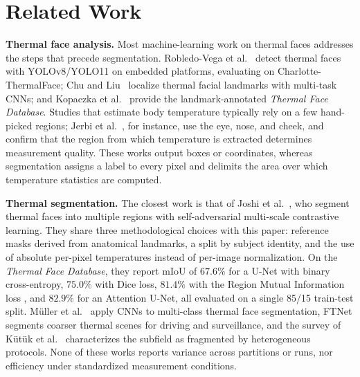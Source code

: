 \section{Related Work} \label{sec:trab_relac}

\textbf{Thermal face analysis.}
Most machine-learning work on thermal faces addresses the steps that precede segmentation.
Robledo-Vega et al.~\cite{Vega2025} detect thermal faces with YOLOv8/YOLO11 on embedded platforms, evaluating on Charlotte-ThermalFace; Chu and Liu~\cite{Chu2019} localize thermal facial landmarks with multi-task CNNs; and Kopaczka et al.~\cite{Kopaczka2018} provide the landmark-annotated \textit{Thermal Face Database}.
Studies that estimate body temperature typically rely on a few hand-picked regions; Jerbi et al.~\cite{Jerbi2024}, for instance, use the eye, nose, and cheek, and confirm that the region from which temperature is extracted determines measurement quality.
These works output boxes or coordinates, whereas segmentation assigns a label to every pixel and delimits the area over which temperature statistics are computed.

\textbf{Thermal segmentation.}
The closest work is that of Joshi et al.~\cite{Joshi2022}, who segment thermal faces into multiple regions with self-adversarial multi-scale contrastive learning.
They share three methodological choices with this paper: reference masks derived from anatomical landmarks, a split by subject identity, and the use of absolute per-pixel temperatures instead of per-image normalization.
On the \textit{Thermal Face Database}, they report mIoU of $67.6\%$ for a U-Net with binary cross-entropy, $75.0\%$ with Dice loss, $81.4\%$ with the Region Mutual Information loss \cite{Zhao2019}, and $82.9\%$ for an Attention U-Net, all evaluated on a single 85/15 train-test split.
M\"uller et al.~\cite{Muller2021} apply CNNs to multi-class thermal face segmentation, FTNet \cite{Panetta2021} segments coarser thermal scenes for driving and surveillance, and the survey of K\"ut\"uk et al.~\cite{Kutuk2022} characterizes the subfield as fragmented by heterogeneous protocols.
None of these works reports variance across partitions or runs, nor efficiency under standardized measurement conditions.

